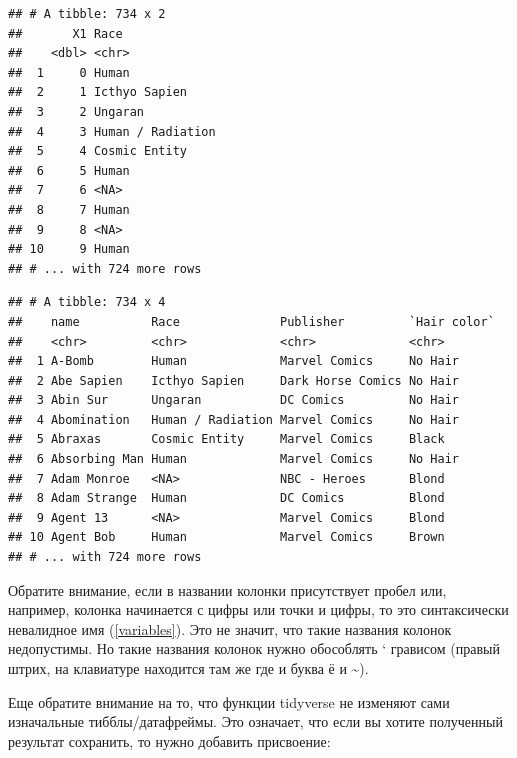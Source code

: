 \documentclass[
]{book}
\newenvironment{Shaded}{\begin{snugshade}}{\end{snugshade}}
\newcommand{\DataTypeTok}[1]{\textcolor[rgb]{0.13,0.29,0.53}{#1}}
\newcommand{\KeywordTok}[1]{\textcolor[rgb]{0.13,0.29,0.53}{\textbf{#1}}}
\newcommand{\NormalTok}[1]{#1}
\newcommand{\OperatorTok}[1]{\textcolor[rgb]{0.81,0.36,0.00}{\textbf{#1}}}
\newcommand{\StringTok}[1]{\textcolor[rgb]{0.31,0.60,0.02}{#1}}
\begin{document}
\begin{verbatim}
## # A tibble: 734 x 2
##       X1 Race             
##    <dbl> <chr>            
##  1     0 Human            
##  2     1 Icthyo Sapien    
##  3     2 Ungaran          
##  4     3 Human / Radiation
##  5     4 Cosmic Entity    
##  6     5 Human            
##  7     6 <NA>             
##  8     7 Human            
##  9     8 <NA>             
## 10     9 Human            
## # ... with 724 more rows
\end{verbatim}

\begin{Shaded}
\end{Shaded}

\begin{verbatim}
## # A tibble: 734 x 4
##    name          Race              Publisher         `Hair color`
##    <chr>         <chr>             <chr>             <chr>       
##  1 A-Bomb        Human             Marvel Comics     No Hair     
##  2 Abe Sapien    Icthyo Sapien     Dark Horse Comics No Hair     
##  3 Abin Sur      Ungaran           DC Comics         No Hair     
##  4 Abomination   Human / Radiation Marvel Comics     No Hair     
##  5 Abraxas       Cosmic Entity     Marvel Comics     Black       
##  6 Absorbing Man Human             Marvel Comics     No Hair     
##  7 Adam Monroe   <NA>              NBC - Heroes      Blond       
##  8 Adam Strange  Human             DC Comics         Blond       
##  9 Agent 13      <NA>              Marvel Comics     Blond       
## 10 Agent Bob     Human             Marvel Comics     Brown       
## # ... with 724 more rows
\end{verbatim}

Обратите внимание, если в названии колонки присутствует пробел или, например, колонка начинается с цифры или точки и цифры, то это синтаксически невалидное имя (\ref{variables}). Это не значит, что такие названия колонок недопустимы. Но такие названия колонок нужно обособлять ` грависом (правый штрих, на клавиатуре находится там же где и буква ё и \textasciitilde).

Еще обратите внимание на то, что функции tidyverse не изменяют сами изначальные тибблы/датафреймы. Это означает, что если вы хотите полученный результат сохранить, то нужно добавить присвоение:
\end{document}
